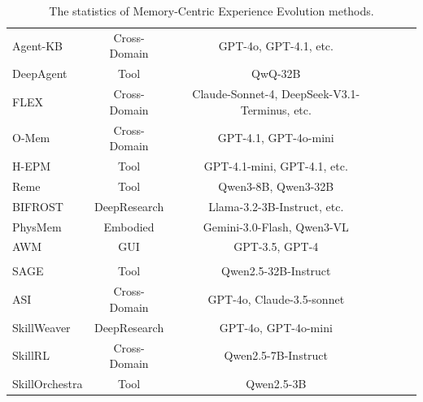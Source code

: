 \documentclass{llmxive}
\providecommand{\Yes}{\ding{51}}
\providecommand{\No}{\ding{55}}
\begin{document}
\begin{table}[tbp]
{\begin{tabular}{lccccc}
Agent-KB \cite{AGENTKB_2} &
  Cross-Domain &
  GPT-4o, GPT-4.1, etc. &
  \Yes &
  \Yes &
  \No \\

DeepAgent \cite{DeepAgent} &
  Tool &
  QwQ-32B &
  \Yes &
  \Yes &
  \Yes \\

FLEX \cite{FLEX} &
  Cross-Domain &
  Claude-Sonnet-4, DeepSeek-V3.1-Terminus, etc. &
  \No &
  \Yes &
  \No \\

O-Mem \cite{O-Mem} &
  Cross-Domain &
  GPT-4.1, GPT-4o-mini &
  \No &
  \Yes &
  \No \\

H-EPM \cite{H-EPM} &
  Tool &
  GPT-4.1-mini, GPT-4.1, etc. &
  \Yes &
  \Yes &
  \Yes \\

Reme \cite{Reme} &
  Tool &
  Qwen3-8B, Qwen3-32B &
  \No &
  \Yes &
  \No \\

BIFROST \cite{BIFROST} &
  DeepResearch &
  Llama-3.2-3B-Instruct, etc. &
  \Yes &
  \No &
  \No \\

PhysMem \cite{PhysMem} &
  Embodied &
  Gemini-3.0-Flash, Qwen3-VL &
  \Yes &
  \Yes &
  \No \\

AWM \cite{AWM} &
  GUI &
  GPT-3.5, GPT-4 &
  \Yes &
  \Yes &
  \No \\
  \midrule
\rowcolor{gray!10!white} \multicolumn{6}{c}{\textbf{\textit{Structured Skill Experience (\cref{sec:structure_skill_experience})}}} %
\\
SAGE \cite{SAGE} &
  Tool &
  Qwen2.5-32B-Instruct &
  \No &
  \Yes &
  \Yes \\

ASI \cite{ASI} &
  Cross-Domain &
  GPT-4o, Claude-3.5-sonnet &
  \Yes &
  \Yes &
  \No \\

SkillWeaver \cite{SkillWeaver} &
  DeepResearch &
  GPT-4o, GPT-4o-mini &
  \No &
  \Yes &
  \No \\

SkillRL \cite{SkillRL_2} &
  Cross-Domain &
  Qwen2.5-7B-Instruct &
  \Yes &
  \Yes &
  \Yes \\

SkillOrchestra \cite{SkillOrchestra} &
  Tool &
  Qwen2.5-3B &
  \Yes &
  \Yes &
  \Yes \\

\bottomrule
\end{tabular}%
}
\label{tab:experience}
\caption{The statistics of Memory-Centric Experience Evolution methods. }
\end{table}
\end{document}
